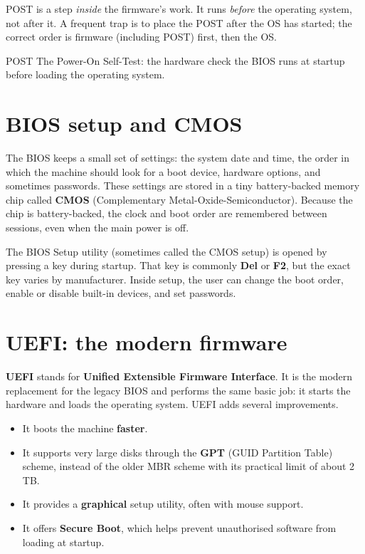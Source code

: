 POST is a step \emph{inside} the firmware's work. It runs \emph{before} the
operating system, not after it. A frequent trap is to place the POST after
the OS has started; the correct order is firmware (including POST) first,
then the OS.

\begin{definitionbox}{POST}
The Power-On Self-Test: the hardware check the BIOS runs at startup before
loading the operating system.
\end{definitionbox}

\section{BIOS setup and CMOS}
The BIOS keeps a small set of settings: the system date and time, the order
in which the machine should look for a boot device, hardware options, and
sometimes passwords. These settings are stored in a tiny battery-backed
memory chip called \textbf{CMOS} (Complementary
Metal-Oxide-Semiconductor). Because the chip is battery-backed, the clock
and boot order are remembered between sessions, even when the main power is
off.

The BIOS Setup utility (sometimes called the CMOS setup) is opened by
pressing a key during startup. That key is commonly \textbf{Del} or
\textbf{F2}, but the exact key varies by manufacturer. Inside setup, the
user can change the boot order, enable or disable built-in devices, and set
passwords.

\section{UEFI: the modern firmware}
\textbf{UEFI} stands for \textbf{Unified Extensible Firmware Interface}. It
is the modern replacement for the legacy BIOS and performs the same basic
job: it starts the hardware and loads the operating system. UEFI adds
several improvements.

\begin{itemize}
  \item It boots the machine \textbf{faster}.
  \item It supports very large disks through the \textbf{GPT} (GUID
    Partition Table) scheme, instead of the older MBR scheme with its
    practical limit of about 2 TB.
  \item It provides a \textbf{graphical} setup utility, often with mouse
    support.
  \item It offers \textbf{Secure Boot}, which helps prevent unauthorised
    software from loading at startup.
\end{itemize}

